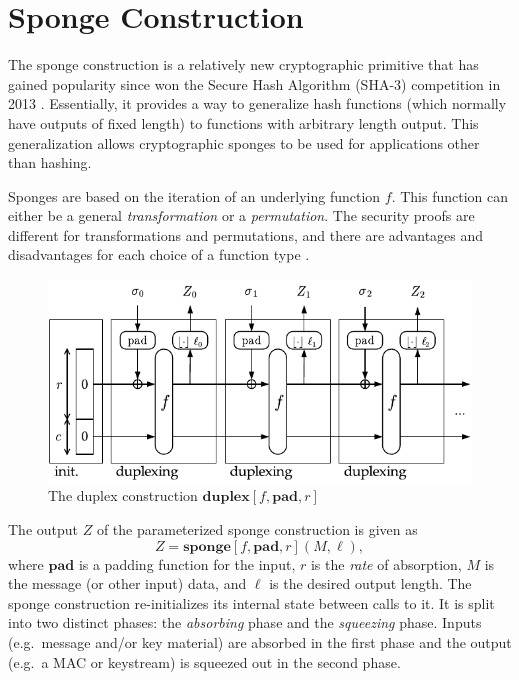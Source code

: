\section{Sponge Construction}

\label{sec:SpongeAndDuplex}
The sponge construction is a relatively new cryptographic primitive that has gained popularity since \Keccak won the Secure Hash Algorithm (SHA-3) competition in 2013 \cite{Bertoni2011_KeccakReference}\cite{NIST2012_SHA3_Winner}.
Essentially, it provides a way to generalize hash functions (which normally have outputs of fixed length) to functions with arbitrary length output.
This generalization allows cryptographic sponges to be used for applications other than hashing.

Sponges are based on the iteration of an underlying function $f$.
This function can either be a general \emph{transformation} or a \emph{permutation}.
The security proofs are different for transformations and permutations, and there are advantages and disadvantages for each choice of a function type \cite{Bertoni2011_SpongeFunctions}.

\begin{figure}
\centering
\includegraphics[width=\columnwidth]{img/Duplex.pdf}
\caption{The duplex construction $\mathbf{duplex}[f,\mathbf{pad},r]$ \cite{Bertoni2011_SpongeFunctions}}
\label{fig:Duplex}
\end{figure}

The output $Z$ of the parameterized sponge construction is given as
\begin{equation*}
\label{eq:SpongeOutput}
Z = \mathbf{sponge}[f,\mathbf{pad},r](M,\ell),
\end{equation*}
where $\mathbf{pad}$ is a padding function for the input, $r$ is the \emph{rate} of absorption, $M$ is the message (or other input) data, and $\ell$ is the desired output length.
The sponge construction re-initializes its internal state between calls to it.
It is split into two distinct phases: the \emph{absorbing} phase and the \emph{squeezing} phase.
Inputs (e.g.\ message and/or key material) are absorbed in the first phase and the output (e.g.\ a MAC or keystream) is squeezed out in the second phase.

